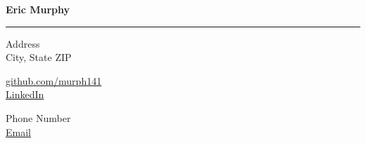 \documentclass[12pt]{article}
\begin{document}
\thispagestyle{empty}


\newcommand{\Heading}[1]
{
  \noindent \newline {\large \bf #1}
  \smallskip \hrule \vspace{-5pt}
}

\newcommand{\Activity}[4]
{
  {\bf #1}, {\it #2} \hfill #3 -- #4 \\
}

\newcommand{\ActivityWithLink}[4]
{
  \href{#1}{\bf #2}, {\it #3} \hfill #4 \\
}

\newcommand{\SpacedBullet}[1]
{
  \hspace{0.3in} #1 \\
}



\centerline{\LARGE \bf Eric Murphy}

\hrule height 0.9pt \vspace{-10pt} %

\begin{multicols}{3}

  \begin{flushleft}
    Address \\
    City, State ZIP \\
  \end{flushleft}

  \begin{center}
    \href{https://www.github.com/murph141}{github.com/murph141} \\
    \href{}{LinkedIn} \\
  \end{center}

  \begin{flushright}
    Phone Number \\
    \href{}{Email} \\
  \end{flushright}

\end{multicols}


\vspace{-5pt}
\end{document}
